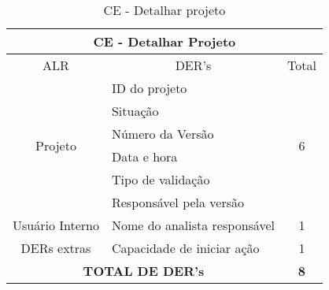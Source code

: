       \begin{table}[!h]
      \centering
      \caption{CE - Detalhar projeto}
      \label{ce_detalhar_projeto}
      \begin{tabular}{|c|l|c|}
      \hline
      \multicolumn{3}{|c|}{CE - Detalhar Projeto}                                  \\ \hline
      ALR                      & \multicolumn{1}{c|}{DER's}   & Total              \\ \hline
      \multirow{6}{*}{Projeto} & ID do projeto                & \multirow{6}{*}{6} \\ \cline{2-2}
			      & Situação                     &                    \\ \cline{2-2}
			      & Número da Versão             &                    \\ \cline{2-2}
			      & Data e hora                  &                    \\ \cline{2-2}
			      & Tipo de validação            &                    \\ \cline{2-2}
			      & Responsável pela versão      &                    \\ \hline
      Usuário Interno                 & Nome do analista responsável & 1                  \\ \hline
      DERs extras              & Capacidade de iniciar ação   & 1                  \\ \hline
      \multicolumn{2}{|c|}{\textbf{TOTAL DE DER's}}           & \textbf{8}         \\ \hline
      \end{tabular}
      \end{table}
      


      
      